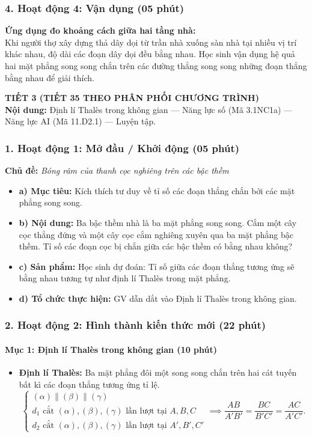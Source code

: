 \documentclass[12pt, a4paper]{article}
\begin{document}
\subsubsection*{4. Hoạt động 4: Vận dụng (05 phút)}
\textbf{Ứng dụng đo khoảng cách giữa hai tầng nhà:}\\
Khi người thợ xây dựng thả dây dọi từ trần nhà xuống sàn nhà tại nhiều vị trí khác nhau, độ dài các đoạn dây dọi đều bằng nhau. Học sinh vận dụng hệ quả hai mặt phẳng song song chắn trên các đường thẳng song song những đoạn thẳng bằng nhau để giải thích.

\newpage

{\large \textbf{TIẾT 3 (TIẾT 35 THEO PHÂN PHỐI CHƯƠNG TRÌNH)}}\\[0.3em]
\textbf{Nội dung:} Định lí Thalès trong không gian --- Năng lực số (Mã 3.1NC1a) --- Năng lực AI (Mã 11.D2.1) --- Luyện tập.

\subsubsection*{1. Hoạt động 1: Mở đầu / Khởi động (05 phút)}
\textbf{Chủ đề:} \textit{Bóng râm của thanh cọc nghiêng trên các bậc thềm}
\begin{itemize}
    \item \textbf{a) Mục tiêu:} Kích thích tư duy về tỉ số các đoạn thẳng chắn bởi các mặt phẳng song song.
    \item \textbf{b) Nội dung:} Ba bậc thềm nhà là ba mặt phẳng song song. Cắm một cây cọc thẳng đứng và một cây cọc cắm nghiêng xuyên qua ba mặt phẳng bậc thềm. Tỉ số các đoạn cọc bị chắn giữa các bậc thềm có bằng nhau không?
    \item \textbf{c) Sản phẩm:} Học sinh dự đoán: Tỉ số giữa các đoạn thẳng tương ứng sẽ bằng nhau tương tự như định lí Thalès trong mặt phẳng.
    \item \textbf{d) Tổ chức thực hiện:} GV dẫn dắt vào Định lí Thalès trong không gian.
\end{itemize}

\subsubsection*{2. Hoạt động 2: Hình thành kiến thức mới (22 phút)}

\paragraph{Mục 1: Định lí Thalès trong không gian (10 phút)}
\begin{itemize}
    \item \textbf{Định lí Thalès:} Ba mặt phẳng đôi một song song chắn trên hai cát tuyến bất kì các đoạn thẳng tương ứng tỉ lệ.
    $$\begin{cases} (\alpha) \parallel (\beta) \parallel (\gamma) \\ d_1 \text{ cắt } (\alpha), (\beta), (\gamma) \text{ lần lượt tại } A, B, C \\ d_2 \text{ cắt } (\alpha), (\beta), (\gamma) \text{ lần lượt tại } A', B', C' \end{cases} \implies \dfrac{AB}{A'B'} = \dfrac{BC}{B'C'} = \dfrac{AC}{A'C'}.$$
\end{itemize}
\end{document}
